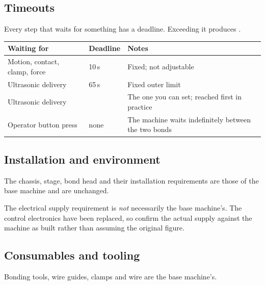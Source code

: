 
\subsection*{Timeouts}

Every step that waits for something has a deadline. Exceeding it produces
.

\begin{center}\small
\begin{tabular}{@{}L{34mm}L{30mm}L{55mm}@{}}
\toprule
\textbf{Waiting for} & \textbf{Deadline} & \textbf{Notes} \\
\midrule
Motion, contact, clamp, force & 10\,s & Fixed; not adjustable \\
Ultrasonic delivery   & 65\,s        & Fixed outer limit \\
Ultrasonic delivery   &  & The one you can set;
                                        reached first in practice \\
Operator button press & none         & The machine waits indefinitely between
                                        the two bonds \\
\bottomrule
\end{tabular}
\end{center}

\subsection*{Installation and environment}

The chassis, stage, bond head and their installation requirements are those of
the base machine and are unchanged.


\begin{wbnote}
The electrical supply requirement is \emph{not} necessarily the base machine's.
The control electronics have been replaced, so confirm the actual supply
against the machine as built rather than assuming the original figure.
\end{wbnote}

\subsection*{Consumables and tooling}

Bonding tools, wire guides, clamps and wire are the base machine's.

